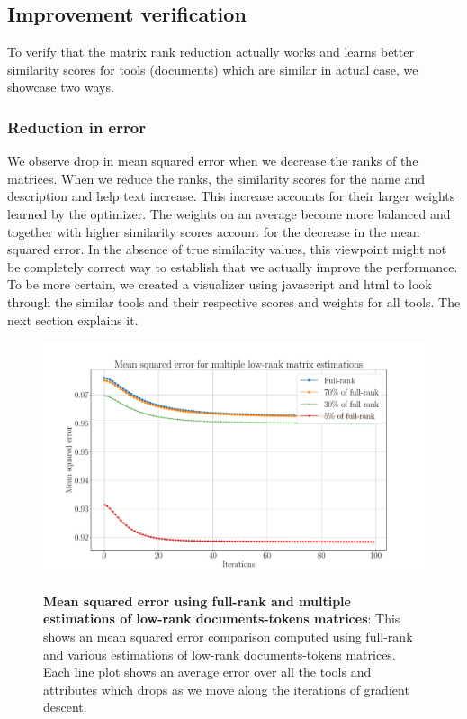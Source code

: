 \subsection{Improvement verification}
To verify that the matrix rank reduction actually works and learns better similarity scores for tools (documents) which are similar in actual case, we showcase two ways.

\subsubsection{Reduction in error}
We observe drop in mean squared error when we decrease the ranks of the matrices. When we reduce the ranks, the similarity scores for the name and description and help text increase. This increase accounts for their larger weights learned by the optimizer. The weights on an average become more balanced and together with higher similarity scores account for the decrease in the mean squared error. In the absence of true similarity values, this viewpoint might not be completely correct way to establish that we actually improve the performance. To be more certain, we created a visualizer using javascript and html to look through the similar tools and their respective scores and weights for all tools. The next section explains it.

\begin{figure}[h]
\begin{centering}
    {\includegraphics[scale=0.35]{figures/MSE_iterations_low_rank.pdf}}
    \caption[Mean squared error using LSI]{\textbf{Mean squared error using full-rank and multiple estimations of low-rank documents-tokens matrices}: This shows an mean squared error comparison computed using full-rank and various estimations of low-rank documents-tokens matrices. Each line plot shows an average error over all the tools and attributes which drops as we move along the iterations of gradient descent.}
\end{centering}
\end{figure}

